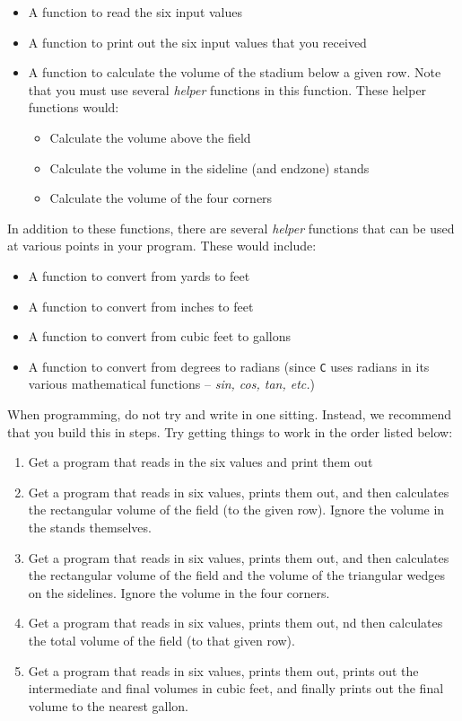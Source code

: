 \documentclass[12pt]{article}
\begin{document}
\begin{itemize}
\item A function to read the six input values
\item A function to print out the six input values that you received
\item A function to calculate the volume of the stadium below a given row.
Note that you must use several {\it helper} functions in
this function.  These helper functions would:
\begin{itemize}
\item Calculate the volume above the field
\item Calculate the volume in the sideline (and endzone) stands
\item Calculate the volume of the four corners
\end{itemize}
\end{itemize} 

In addition to these functions, there are several {\it helper}
functions that can be used at various points in your program.  These
would include:

\begin{itemize}
\item A function to convert from yards to feet
\item A function to convert from inches to feet
\item A function to convert from cubic feet to gallons
\item A function to convert from degrees to radians (since {\tt C} uses 
radians in its various mathematical functions -- {\it sin, cos, tan, etc.})
\end{itemize}

When programming, do not try and write in one sitting.  Instead, we recommend
that you build this in steps.  Try getting things to work in the order listed below:

\begin{enumerate}
\item Get a program that reads in the six values and print them out
\item Get a program that reads in six values, prints them out, and then
calculates the rectangular volume of the field (to the given row).  Ignore the volume
in the stands themselves.
\item Get a program that reads in six values, prints them out,
and then calculates
the rectangular volume of the field and the volume of the triangular wedges on the
sidelines.  Ignore the volume in the four corners.
\item Get a program that reads in six values, prints them out, 
nd then calculates
the total volume of the field (to that given row).
\item Get a program that reads in six values, prints them out, 
prints out the intermediate and final volumes in
cubic feet,
and finally prints out the final volume to the nearest gallon.
\end{enumerate}
\end{document}
